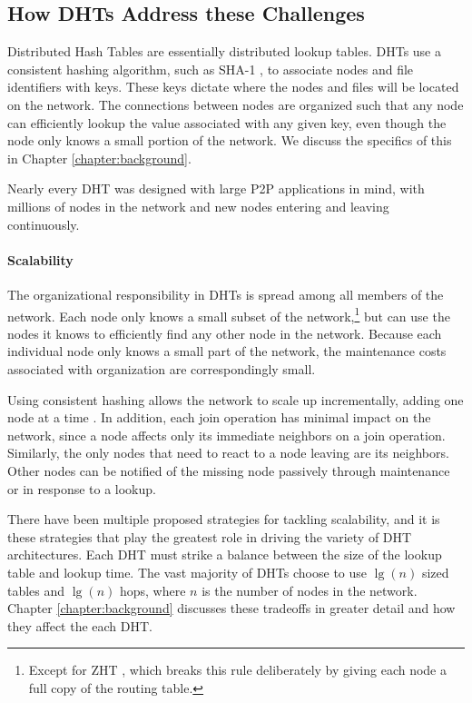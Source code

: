 \subsection{How DHTs Address these Challenges}
Distributed Hash Tables are essentially distributed lookup tables.
DHTs use a consistent hashing algorithm, such as SHA-1 \cite{sha1}, to associate nodes and file identifiers with keys.  
These keys dictate where the nodes and files will be located on the network.
The connections between nodes are organized such that any node can efficiently lookup the value associated with any given key, even though the node only knows a small portion of the network.
We discuss the specifics of this in Chapter \ref{chapter:background}.

Nearly every DHT was designed with large P2P applications in mind, with millions of nodes in the network and new nodes entering and leaving continuously.

\paragraph{Scalability}
The organizational responsibility in DHTs is spread among all members of the network.
Each node only knows a small subset of the network,\footnote{Except for ZHT \cite{li2013zht}, which breaks this rule deliberately by giving each node a full copy of the routing table.} but can use the nodes it knows to efficiently find any other node in the network.
Because each individual node only knows a small part of the network, the maintenance costs associated with organization are correspondingly small.

Using consistent hashing allows the network to scale up incrementally, adding one node at a time \cite{dynamo}.
In addition, each join operation has minimal impact on the network, since a node affects only its immediate neighbors on a join operation.
Similarly, the only nodes that need to react to a node leaving are its neighbors.
Other nodes can be notified of the missing node passively through maintenance or in response to a lookup.

There have been multiple proposed strategies for tackling scalability, and it is these strategies that play the greatest role in driving the variety of DHT architectures. 
Each DHT must strike a balance between the size of the lookup table and lookup time. 
The vast majority of DHTs choose to use $\lg(n)$ sized tables and  $\lg(n)$ hops, where $ n $ is the number of nodes in the network. 
Chapter \ref{chapter:background} discusses these tradeoffs in greater detail and how they affect the each DHT.


